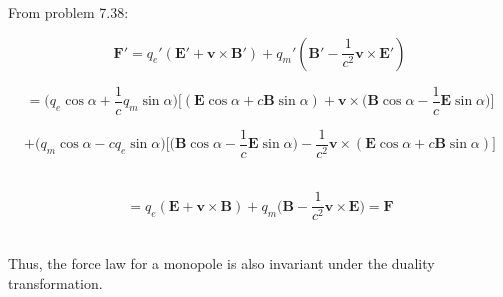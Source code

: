 \documentclass[9pt]{extarticle}
\renewcommand{\v}[1]{{\bm #1}}
\begin{document}
\begin{multicols*}{2}
From problem 7.38:

$$\v F' = q_e'(\v E' + \v v \times \v B') + q_m'(\v B' - \frac{1}{c^2} \v v \times \v E')$$

$$= \bigg(q_e\cos\alpha + \frac 1c q_m  \sin\alpha \bigg) \bigg[ (\v E \cos\alpha + c\v B \sin\alpha) + \v v \times \bigg( \v B\cos\alpha - \frac 1c \v E\sin\alpha \bigg) \bigg]$$

$$+ \bigg( q_m \cos\alpha - cq_e \sin\alpha \bigg) \bigg[ \bigg( \v B \cos\alpha - \frac 1c \v  E\sin\alpha \bigg) - \frac{1}{c^2} \v v \times (\v E\cos\alpha + c \v B\sin\alpha)  \bigg]$$ \ 

$$= q_e (\v E + \v v \times \v B) + q_m \bigg( \v B - \frac{1}{c^2} \v v \times \v E \bigg) = \v F$$ \ 

Thus, the force law for a monopole is also invariant under the duality transformation. 

\end{multicols*}
\end{document}
